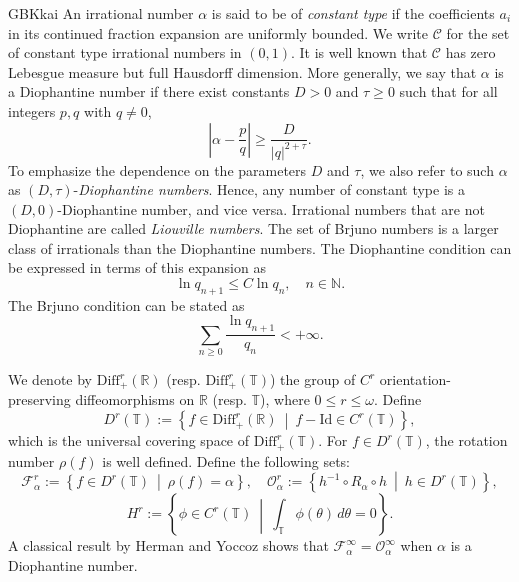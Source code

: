 \documentclass{amsart}
\newcommand{\al}{\alpha}
\theoremstyle{definition}
\begin{document}
\begin{CJK*}{GBK}{kai}
		An irrational number \( \alpha \) is said to be of \emph{constant type} if the coefficients \( a_i \) in its continued fraction expansion are uniformly bounded. We write \( \mathcal{C} \) for the set of constant type irrational numbers in \( (0, 1) \). It is well known that \( \mathcal{C} \) has zero Lebesgue measure but full Hausdorff dimension. More generally, we say that \( \alpha \) is a Diophantine number if there exist constants \( D > 0 \) and \( \tau \geq 0 \) such that for all integers \( p, q \) with \( q \neq 0 \),
\begin{equation}\label{diop}
\left|\alpha - \frac{p}{q}\right| \geq \frac{D}{|q|^{2+\tau}}.
\end{equation}
To emphasize the dependence on the parameters \( D \) and \( \tau \), we also refer to such \( \alpha \) as \((D, \tau)\)-\emph{Diophantine numbers}. Hence, any number of constant type is a \((D, 0)\)-Diophantine number, and vice versa. Irrational numbers that are not Diophantine are called \emph{Liouville numbers}. The set of Brjuno numbers is a larger class of irrationals than the Diophantine numbers. The Diophantine condition can be expressed in terms of this expansion as
\begin{equation}\label{dionu}
\ln q_{n+1} \leq C \ln q_n, \quad n \in \mathbb{N}.
\end{equation}
The Brjuno condition can be stated as
\begin{equation}\label{brun}
\sum_{n \geq 0} \frac{\ln q_{n+1}}{q_n} < +\infty.
\end{equation}

We denote by \( \mathrm{Diff}_+^r(\mathbb{R}) \) (resp. \( \mathrm{Diff}_+^r(\mathbb{T}) \)) the group of \( C^r \) orientation-preserving diffeomorphisms on \( \mathbb{R} \) (resp. \( \mathbb{T} \)), where \( 0 \leq r \leq \omega \). Define
		\[
		D^r(\mathbb{T}) := \left\{ f \in \mathrm{Diff}_+^r(\mathbb{R})\ \middle|\ f - \mathrm{Id} \in C^r(\mathbb{T}) \right\},
		\]
		which is the universal covering space of \( \mathrm{Diff}_+^r(\mathbb{T}) \). For \( f \in D^r(\mathbb{T}) \), the rotation number \( \rho(f) \) is well defined. Define the following sets:
		\[
		\mathcal{F}_\al^r := \left\{ f \in D^r(\mathbb{T})\ \middle|\ \rho(f) = \alpha \right\}, \quad
		\mathcal{O}_\al^r := \left\{ h^{-1} \circ R_\alpha \circ h\ \middle|\ h \in D^r(\mathbb{T}) \right\},
		\]
		\[
		{H}^r := \left\{ \phi \in C^r(\mathbb{T})\ \middle|\ \int_{\mathbb{T}} \phi(\theta)\, d\theta = 0 \right\}.
		\]
		A classical result by Herman and Yoccoz \cite{H11,Y1} shows that \( \mathcal{F}_\al^\infty = \mathcal{O}_\al^\infty \) when \( \alpha \) is a Diophantine number.
		

\end{CJK*}
\end{document}
